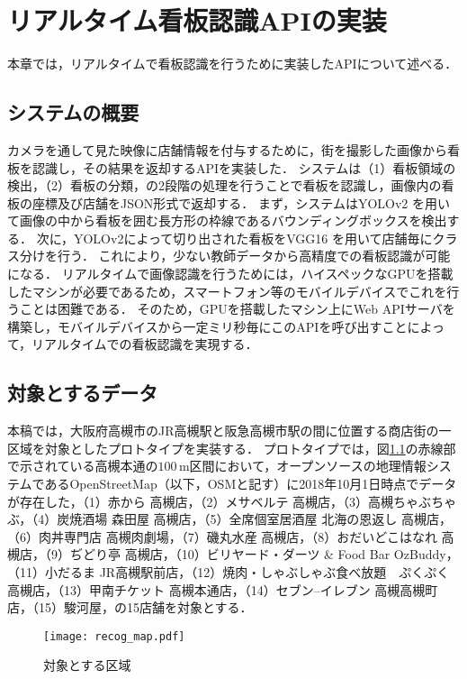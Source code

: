 \chapter{リアルタイム看板認識APIの実装}
\label{chapter:implement_recog}
本章では，リアルタイムで看板認識を行うために実装したAPIについて述べる．

\section{システムの概要}
  カメラを通して見た映像に店舗情報を付与するために，街を撮影した画像から看板を認識し，その結果を返却するAPIを実装した\cite{Kitamura:2018}．
  システムは（1）看板領域の検出，（2）看板の分類，の2段階の処理を行うことで看板を認識し，画像内の看板の座標及び店舗をJSON形式で返却する．
  まず，システムはYOLOv2 \cite{Redmon:2017}を用いて画像の中から看板を囲む長方形の枠線であるバウンディングボックスを検出する．
  次に，YOLOv2によって切り出された看板をVGG16 \cite{Simonyan:2015}を用いて店舗毎にクラス分けを行う．
  これにより，少ない教師データから高精度での看板認識が可能になる．
  リアルタイムで画像認識を行うためには，ハイスペックなGPUを搭載したマシンが必要であるため，スマートフォン等のモバイルデバイスでこれを行うことは困難である．
  そのため，GPUを搭載したマシン上にWeb APIサーバを構築し，モバイルデバイスから一定ミリ秒毎にこのAPIを呼び出すことによって，リアルタイムでの看板認識を実現する．
  
\section{対象とするデータ}
\label{section:target_data}
  本稿では，大阪府高槻市のJR高槻駅と阪急高槻市駅の間に位置する商店街の一区域を対象としたプロトタイプを実装する．
  プロトタイプでは，図\ref{figure:recog_map}の赤線部で示されている高槻本通の$100\, \mathrm{m}$区間において，オープンソースの地理情報システムであるOpenStreetMap（以下，OSMと記す）\cite{Haklay:2008}に2018年10月1日時点でデータが存在した，（1）赤から 高槻店，（2）メサベルテ 高槻店，（3）高槻ちゃぶちゃぶ，（4）炭焼酒場 森田屋 高槻店，（5）全席個室居酒屋 北海の恩返し 高槻店，（6）肉丼専門店 高槻肉劇場，（7）磯丸水産 高槻店，（8）おだいどこはなれ 高槻店，（9）ぢどり亭 高槻店，（10）ビリヤード・ダーツ \& Food Bar OzBuddy，（11）小だるま JR高槻駅前店，（12）焼肉・しゃぶしゃぶ食べ放題　ぷくぷく　高槻店，（13）甲南チケット 高槻本通店，（14）セブン--イレブン 高槻高槻町店，（15）駿河屋，の15店舗を対象とする．
  \begin{figure}[tb]
    \centerline{\texttt{[image: recog\_map.pdf]}}
    \caption{対象とする区域}
    \label{figure:recog_map}
  \end{figure}


